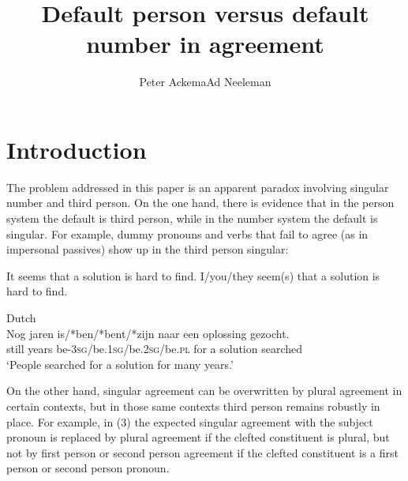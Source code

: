 \documentclass[output=paper]{langsci/langscibook}
\title{Default person versus default number in agreement}
\author{Peter Ackema\affiliation{University of Edinburgh}\lastand Ad Neeleman\affiliation{UCL}}
\begin{document}
 

 

 

 

 

\section{Introduction}

The problem addressed in this paper is an apparent paradox involving singular number and third person. On the one hand, there is evidence that in the person system the default is third person, while in the number system the default is singular. For example, dummy pronouns and verbs that fail to agree (as in impersonal passives) show up in the third person singular:

\ea 
  \ea[] It seems that a solution is hard to find.
  \ex[*] I/you/they seem(s) that a solution is hard to find.
  \z
\z

\ea Dutch \\
\gll Nog  jaren  is/*ben/*bent/*zijn              naar een oplossing gezocht.\\
  still years  be-\textsc{3sg}/be.\textsc{1sg}/be.\textsc{2sg}/be.\textsc{pl} for   a    solution   searched\\
\glt ‘People searched for a solution for many years.’
\z

On the other hand, singular agreement can be overwritten by plural agreement in certain contexts, but in those same contexts third person remains robustly in place. For example, in (3) the expected singular agreement with the subject pronoun is replaced by plural agreement if the clefted constituent is plural, but not by first person or second person agreement if the clefted constituent is a first person or second person pronoun.
\end{document}
